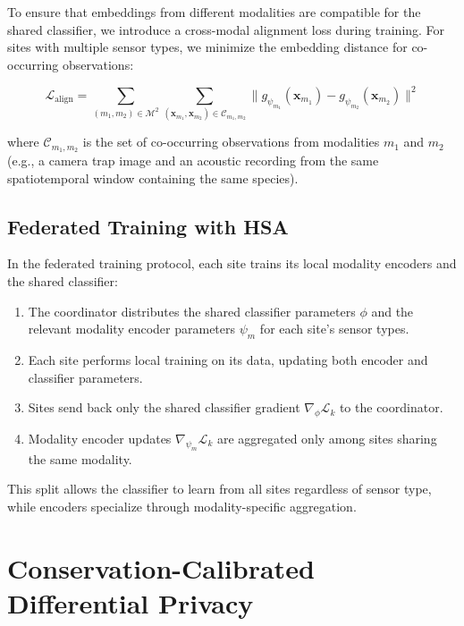 \documentclass[11pt,a4paper]{article}
\begin{document}
To ensure that embeddings from different modalities are compatible for the shared classifier, we introduce a cross-modal alignment loss during training.
For sites with multiple sensor types, we minimize the embedding distance for co-occurring observations:

\begin{equation}
    \mathcal{L}_{\text{align}} = \sum_{(m_1, m_2) \in \mathcal{M}^2} \sum_{(\mathbf{x}_{m_1}, \mathbf{x}_{m_2}) \in \mathcal{C}_{m_1, m_2}} \|g_{\psi_{m_1}}(\mathbf{x}_{m_1}) - g_{\psi_{m_2}}(\mathbf{x}_{m_2})\|^2
\end{equation}

\noindent where $\mathcal{C}_{m_1, m_2}$ is the set of co-occurring observations from modalities $m_1$ and $m_2$ (e.g., a camera trap image and an acoustic recording from the same spatiotemporal window containing the same species).

\subsection{Federated Training with HSA}

In the federated training protocol, each site trains its local modality encoders and the shared classifier:

\begin{enumerate}[leftmargin=*]
    \item The coordinator distributes the shared classifier parameters $\phi$ and the relevant modality encoder parameters $\psi_m$ for each site's sensor types.
    \item Each site performs local training on its data, updating both encoder and classifier parameters.
    \item Sites send back only the shared classifier gradient $\nabla_\phi \mathcal{L}_k$ to the coordinator.
    \item Modality encoder updates $\nabla_{\psi_m} \mathcal{L}_k$ are aggregated only among sites sharing the same modality.
\end{enumerate}

This split allows the classifier to learn from all sites regardless of sensor type, while encoders specialize through modality-specific aggregation.

\section{Conservation-Calibrated Differential Privacy}
\label{sec:privacy}
\end{document}
